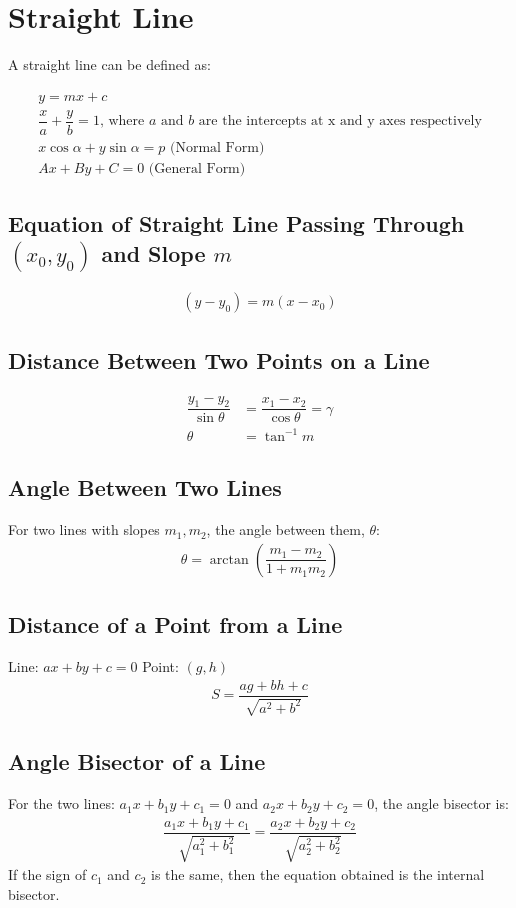 \documentclass[../main.tex]{subfile}
\begin{document}
	\chapter{Straight Line}
	A straight line can be defined as:
	
	\begin{align}
		y=mx+c\\
		\dfrac{x}{a}+\dfrac{y}{b}=1\text{, where }a\text{ and }b\text{ are the intercepts at x and y axes respectively}\\
		x\cos\alpha + y\sin\alpha = p\text{ (Normal Form)}\\
		Ax+By+C=0\text{ (General Form)}
	\end{align}
	
	\section{Equation of Straight Line Passing Through $(x_0,y_0)$ and Slope $m$}
	\begin{align}
		(y-y_0)=m(x-x_0)
	\end{align}
	
	\section{Distance Between Two Points on a Line}
	\begin{align}
		\dfrac{y_1-y_2}{\sin\theta} & = \dfrac{x_1-x_2}{\cos\theta} = \gamma\\
		\theta & = \tan^{-1}m
	\end{align}
	
	\section{Angle Between Two Lines}
	For two lines with slopes $m_1, m_2$, the angle between them, $\theta$:
	\begin{align}
		\theta=\arctan\left(\dfrac{m_1-m_2}{1+m_1m_2}\right)
	\end{align}
	
	\section{Distance of a Point from a Line\newline}
	Line: $ax+by+c=0$
	Point: $(g,h)$
	\begin{align}
		S=\dfrac{ag+bh+c}{\sqrt{a^2+b^2}}
	\end{align}
	
	\section{Angle Bisector of a Line}
	For the two lines: $a_1x+b_1y+c_1=0$ and $a_2x+b_2y+c_2=0$, the angle bisector is:
	\begin{align}
		\dfrac{a_1x+b_1y+c_1}{\sqrt{a_1^2+b_1^2}}=\dfrac{a_2x+b_2y+c_2}{\sqrt{a_2^2+b_2^2}}
	\end{align}
	If the sign of $c_1$ and $c_2$ is the same, then the equation obtained is the internal bisector.
	
\end{document}
